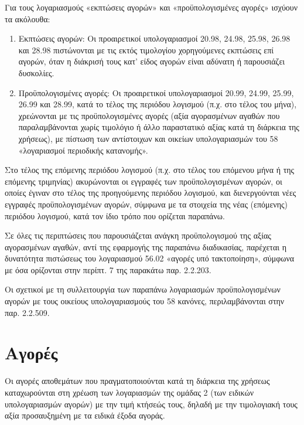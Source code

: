 \documentclass[A4,10pt,greek]{book}
\begin{document}
Για τους λογαριασμούς «εκπτώσεις αγορών» και «προϋπολογισμένες αγορές» ισχύουν τα ακόλουθα:

\begin{enumerate}

\item Εκπτώσεις αγορών: Οι προαιρετικοί υπολογαριασμοί 20.98, 24.98, 25.98, 26.98 και 28.98 πιστώνονται με τις εκτός τιμολογίου χορηγούμενες εκπτώσεις επί αγορών, όταν η διάκρισή τους κατ' είδος αγορών είναι αδύνατη ή παρουσιάζει δυσκολίες.

\item Προϋπολογισμένες αγορές: Οι προαιρετικοί υπολογαριασμοί 20.99, 24.99, 25.99, 26.99 και 28.99, κατά το τέλος της περιόδου λογισμού (π.χ. στο τέλος του μήνα), χρεώνονται με τις προϋπολογισμένες αγορές (αξία αγορασμένων αγαθών που παραλαμβάνονται χωρίς τιμολόγιο ή άλλο παραστατικό αξίας κατά τη διάρκεια της χρήσεως), με πίστωση των αντίστοιχων και οικείων υπολογαριασμών του 58 «λογαριασμοί περιοδικής κατανομής».

\end{enumerate}

Στο τέλος της επόμενης περιόδου λογισμού (π.χ. στο τέλος του επόμενου μήνα ή της επόμενης τριμηνίας) ακυρώνονται οι εγγραφές των προϋπολογισμένων αγορών, οι οποίες έγιναν στο τέλος της προηγούμενης περιόδου λογισμού, και διενεργούνται νέες εγγραφές προϋπολογισμένων αγορών, σύμφωνα με τα στοιχεία της νέας (επόμενης) περιόδου λογισμού, κατά τον ίδιο τρόπο που ορίζεται παραπάνω.

Σε όλες τις περιπτώσεις που παρουσιάζεται ανάγκη προϋπολογισμού της αξίας αγορασμένων αγαθών, αντί της εφαρμογής της παραπάνω διαδικασίας, παρέχεται η δυνατότητα πιστώσεως του λογαριασμού 56.02 «αγορές υπό τακτοποίηση», σύμφωνα με όσα ορίζονται στην περίπτ. 7 της παρακάτω παρ. 2.2.203.

Οι σχετικοί με τη συλλειτουργία των παραπάνω λογαριασμών προϋπολογισμένων αγορών με τους οικείους υπολογαριασμούς του 58 κανόνες, περιλαμβάνονται στην παρ. 2.2.509.

\section{Αγορές}

Οι αγορές αποθεμάτων που πραγματοποιούνται κατά τη διάρκεια της χρήσεως καταχωρούνται στη χρέωση των λογαριασμών της ομάδας 2 (των ειδικών υπολογαριασμών αγορών) με την τιμή κτήσεώς τους, δηλαδή με την τιμολογιακή τους αξία προσαυξημένη με τα ειδικά έξοδα αγοράς.
\end{document}
